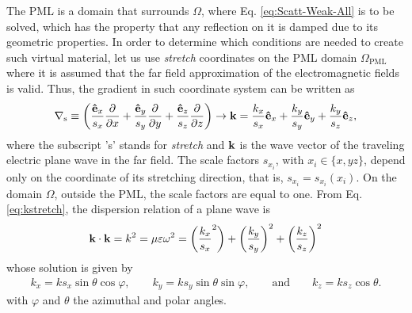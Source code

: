    The PML is a domain that surrounds  $\Omega$, where Eq. \eqref{eq:Scatt-Weak-All} is to be solved, which has the property that any reflection on it is damped due to its geometric properties. In order to determine which conditions are needed to create such virtual material, let us use \textit{stretch} coordinates on the PML domain $\Omega_\text{PML}$ where it is assumed that the far field approximation of the electromagnetic fields is valid. Thus, the gradient in such coordinate system can be written as
     \begin{align}
         \nabla_\text{s} \equiv \qty(\frac{\vu{e}_x }{s_x}\pdv{x} + \frac{\vu{e}_y}{s_y}\pdv{y} + \frac{\vu{e}_z}{s_z}\pdv{z}) \to \vb{k} = \frac{k_x}{s_x}\vu{e}_x + \frac{k_y}{s_y}\vu{e}_y  +\frac{k_y}{s_z}\vu{e}_z,
     \label{eq:kstretch}
     \end{align}
    where the subscript 's' stands for \textit{stretch} and $\vb{k}$ is the wave vector of the traveling electric plane wave in the far field. The scale factors $s_{x_i}$, with $x_i \in \{x, y z\}$, depend only on the coordinate of its stretching direction, that is, $s_{x_i} = s_{x_i}(x_i)$. On the domain $\Omega$, outside the PML, the scale factors are equal to one. From Eq. \eqref{eq:kstretch}, the dispersion relation of a plane wave  is
    \begin{align}
        \vb{k} \cdot \vb{k}  = k^2 = \mu\varepsilon\omega^2 =
            \qty(\frac{k_x}{s_x}^2 )+ \qty(\frac{k_y}{s_y})^2 + \qty(\frac{k_z}{s_z})^2
     \label{eq:k-reldisp}
    \end{align}
    whose solution is given by
    \begin{align}
        k_x = k s_x \sin\theta\cos\varphi, \qquad
            k_y = k s_y \sin\theta\sin\varphi, \qquad \text{and}\qquad
                k_z = k s_z \cos\theta.
     \label{eq:kstretchcomp}
    \end{align}
    with $\varphi$ and $\theta$ the azimuthal and polar angles.

